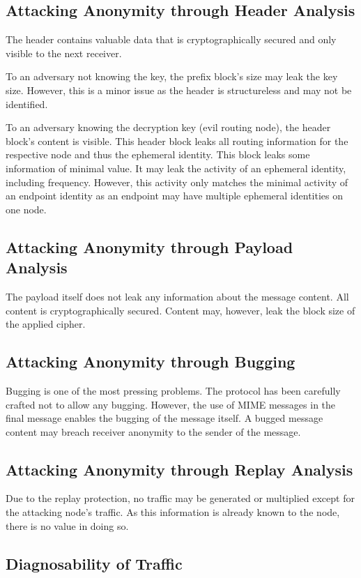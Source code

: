 \subsection{Attacking Anonymity through Header Analysis}
The header contains valuable data that is cryptographically secured and only visible to the next receiver. 

To an adversary not knowing the key, the prefix block's size may leak the key size. However, this is a minor issue as the header is structureless and may not be identified. 

To an adversary knowing the decryption key (evil routing node), the header block's content is visible. This header block leaks all routing information for the respective node and thus the ephemeral identity. This block leaks some information of minimal value. It may leak the activity of an ephemeral identity, including frequency. However, this activity only matches the minimal activity of an endpoint identity as an endpoint may have multiple ephemeral identities on one node. 

\subsection{Attacking Anonymity through Payload Analysis}
The payload itself does not leak any information about the message content. All content is cryptographically secured. Content may, however, leak the block size of the applied cipher.

\subsection{Attacking Anonymity through Bugging}
Bugging is one of the most pressing problems. The protocol has been carefully crafted not to allow any bugging. However, the use of MIME messages in the final message enables the bugging of the message itself. A bugged message content may breach receiver anonymity to the sender of the message.

\subsection{Attacking Anonymity through Replay Analysis}
Due to the replay protection, no traffic may be generated or multiplied except for the attacking node's traffic. As this information is already known to the node, there is no value in doing so. 

\subsection{Diagnosability of Traffic}

